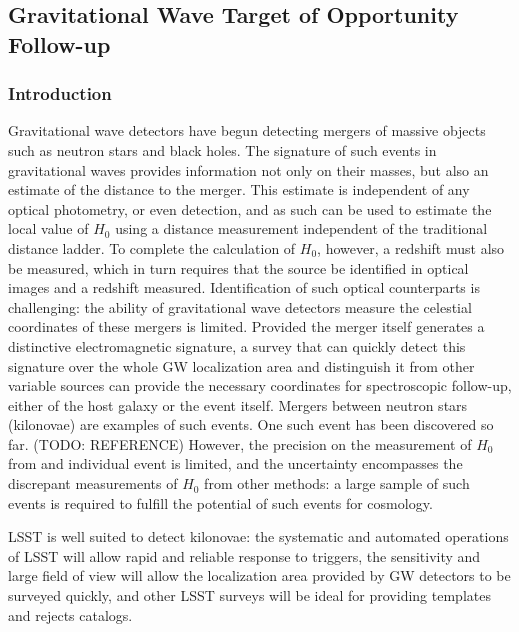 \subsection{Gravitational Wave Target of Opportunity Follow-up}

\subsubsection{Introduction}

Gravitational wave detectors have begun detecting mergers of massive objects such as neutron stars and black holes. The signature of such events in gravitational waves provides information not only on their masses, but also an estimate of the distance to the merger. This estimate is independent of any optical photometry, or even detection, and as such can be used to estimate the local value of $H_0$ using a distance measurement independent of the traditional distance ladder. To complete the calculation of $H_0$, however, a redshift must also be measured, which in turn requires that the source be identified in optical images and a redshift measured. Identification of such optical counterparts is challenging: the ability of gravitational wave detectors measure the celestial coordinates of these mergers is limited. Provided the merger itself generates a distinctive electromagnetic signature, a survey that can quickly detect this signature over the whole GW localization area and distinguish it from other variable sources can provide the necessary coordinates for spectroscopic follow-up, either of the host galaxy or the event itself. Mergers between neutron stars (kilonovae) are examples of such events. One such event has been discovered so far. (TODO: REFERENCE) However, the precision on the measurement of $H_0$ from and individual event is limited, and the uncertainty encompasses the discrepant measurements of $H_0$ from other methods: a large sample of such events is required to fulfill the potential of such events for cosmology.

LSST is well suited to detect kilonovae: the systematic and automated operations of LSST will allow rapid and reliable response to triggers, the sensitivity and large field of view will allow the localization area provided by GW detectors to be surveyed quickly, and other LSST surveys will be ideal for providing templates and rejects catalogs.

